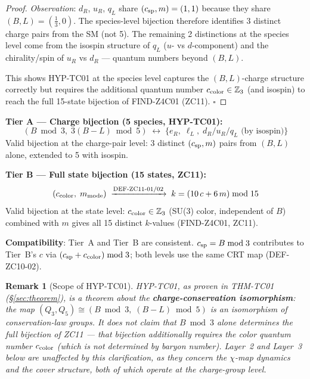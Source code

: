 \documentclass[12pt, a4paper]{article}
\newtheorem{remark}{Remark}[section]
\begin{document}
\begin{proof}
\textit{Observation}: $d_R$, $u_R$, $q_L$ share $(c_{\rm sp},m)=(1,1)$
because they share $(B,L) = (\tfrac{1}{3},0)$. The species-level
bijection therefore identifies 3 distinct charge pairs from the SM
(not 5). The remaining 2 distinctions at the species level come
from the isospin structure of $q_L$ ($u$- vs $d$-component) and
the chirality/spin of $u_R$ vs $d_R$ --- quantum numbers beyond
$(B,L)$.

This shows HYP-TC01 at the species level captures the
$(B,L)$-charge structure correctly but requires the additional
quantum number $c_{\rm color} \in \mathbb{Z}_3$ (and isospin)
to reach the full 15-state bijection of FIND-Z4C01 (ZC11).
\hfill$\square$
\end{proof}

\begin{formalbox}[title={Two-Tier Bijection (EQ-TC2-01, v1.1)}]
\textbf{Tier A --- Charge bijection (5 species, HYP-TC01):}
\begin{equation}
  (B\bmod 3,\; 3(B-L)\bmod 5)
  \;\longleftrightarrow\;
  \{e_R,\; \ell_L,\; d_R/u_R/q_L\text{ (by isospin)}\}
  \label{eq:tierA}
\end{equation}
Valid bijection at the charge-pair level: 3 distinct $(c_{\rm sp},m)$
pairs from $(B,L)$ alone, extended to 5 with isospin.

\smallskip
\textbf{Tier B --- Full state bijection (15 states, ZC11):}
\begin{equation}
  (c_{\rm color},\; m_{\rm mode})
  \;\xrightarrow{\text{DEF-ZC11-01/02}}\;
  k = (10\,c + 6\,m)\bmod 15
  \label{eq:tierB}
\end{equation}
Valid bijection at the state level: $c_{\rm color} \in \mathbb{Z}_3$
(SU(3) color, independent of $B$) combined with $m$ gives all 15
distinct $k$-values (FIND-Z4C01, ZC11).

\smallskip
\textbf{Compatibility}: Tier~A and Tier~B are consistent.
$c_{\rm sp} = B\bmod 3$ contributes to Tier~B's $c$ via
$(c_{\rm sp} + c_{\rm color})\bmod 3$; both levels use the same
CRT map (DEF-ZC10-02).
\end{formalbox}

\begin{remark}[Scope of HYP-TC01]
HYP-TC01, as proven in THM-TC01 (\S\ref{sec:theorem}), is a
theorem about the \textbf{charge-conservation isomorphism}:
the map $(Q_3, Q_5) \cong (B\bmod 3,\; (B-L)\bmod 5)$ is an
isomorphism of conservation-law groups. It does not claim that
$B\bmod 3$ alone determines the full bijection of ZC11 --- that
bijection additionally requires the color quantum number
$c_{\rm color}$ (which is not determined by baryon number).
Layer~2 and Layer~3 below are unaffected by this clarification,
as they concern the $\chi$-map dynamics and the cover structure,
both of which operate at the charge-group level.
\end{remark}
\end{document}
